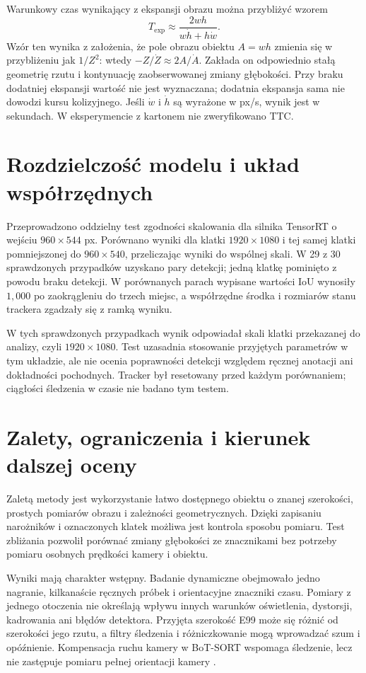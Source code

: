 \documentclass[12pt,a4paper]{article}
\begin{document}
Warunkowy czas wynikający z ekspansji obrazu można przybliżyć wzorem
\begin{equation}
T_{\mathrm{exp}} \approx \frac{2wh}{w\dot h+h\dot w}.
\end{equation}
Wzór ten wynika z założenia, że pole obrazu obiektu $A=wh$ zmienia się w przybliżeniu jak $1/Z^2$: wtedy $-Z/\dot Z\approx2A/\dot A$. Zakłada on odpowiednio stałą geometrię rzutu i kontynuację zaobserwowanej zmiany głębokości. Przy braku dodatniej ekspansji wartość nie jest wyznaczana; dodatnia ekspansja sama nie dowodzi kursu kolizyjnego. Jeśli $\dot w$ i $\dot h$ są wyrażone w px/s, wynik jest w sekundach. W eksperymencie z kartonem nie zweryfikowano TTC.

\section{Rozdzielczość modelu i układ współrzędnych}

Przeprowadzono oddzielny test zgodności skalowania dla silnika TensorRT o wejściu $960\times544$ px. Porównano wyniki dla klatki $1920\times1080$ i tej samej klatki pomniejszonej do $960\times540$, przeliczając wyniki do wspólnej skali. W 29 z 30 sprawdzonych przypadków uzyskano pary detekcji; jedną klatkę pominięto z powodu braku detekcji. W porównanych parach wypisane wartości IoU wynosiły $1{,}000$ po zaokrągleniu do trzech miejsc, a współrzędne środka i rozmiarów stanu trackera zgadzały się z ramką wyniku.

W tych sprawdzonych przypadkach wynik odpowiadał skali klatki przekazanej do analizy, czyli $1920\times1080$. Test uzasadnia stosowanie przyjętych parametrów w tym układzie, ale nie ocenia poprawności detekcji względem ręcznej anotacji ani dokładności pochodnych. Tracker był resetowany przed każdym porównaniem; ciągłości śledzenia w czasie nie badano tym testem.

\section{Zalety, ograniczenia i kierunek dalszej oceny}

Zaletą metody jest wykorzystanie łatwo dostępnego obiektu o znanej szerokości, prostych pomiarów obrazu i zależności geometrycznych. Dzięki zapisaniu narożników i oznaczonych klatek możliwa jest kontrola sposobu pomiaru. Test zbliżania pozwolił porównać zmiany głębokości ze znacznikami bez potrzeby pomiaru osobnych prędkości kamery i obiektu.

Wyniki mają charakter wstępny. Badanie dynamiczne obejmowało jedno nagranie, kilkanaście ręcznych próbek i orientacyjne znaczniki czasu. Pomiary z jednego otoczenia nie określają wpływu innych warunków oświetlenia, dystorsji, kadrowania ani błędów detektora. Przyjęta szerokość E99 może się różnić od szerokości jego rzutu, a filtry śledzenia i różniczkowanie mogą wprowadzać szum i opóźnienie. Kompensacja ruchu kamery w BoT-SORT wspomaga śledzenie, lecz nie zastępuje pomiaru pełnej orientacji kamery \cite{botsort}.
\end{document}
